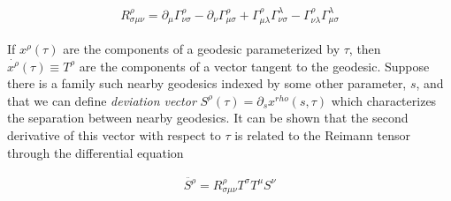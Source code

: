 \documentclass[paper=a4, fontsize=11pt]{scrartcl} %
\numberwithin{equation}{section} %
\numberwithin{figure}{section} %
\numberwithin{table}{section} %
\begin{document}
\begin{align}
R^{\rho}_{\sigma \mu \nu} = \partial_{\mu}\Gamma^{\rho}_{\nu \sigma} - \partial_{\nu}\Gamma^{\rho}_{\mu \sigma} + \Gamma^{\rho}_{\mu \lambda}\Gamma^{\lambda}_{\nu \sigma} - \Gamma^{\rho}_{\nu \lambda}\Gamma^{\lambda}_{\mu \sigma}
\end{align}



If $x^{\rho}(\tau)$ are the components of a geodesic parameterized by $\tau$, then $\dot{x^{\rho}}(\tau) \equiv T^{\rho}$ are the components of a vector tangent to the geodesic. Suppose there is a family such nearby geodesics indexed by some other parameter, $s$, and that we can define \textit{deviation vector} $S^{\rho}(\tau) = \partial_{s}x^{rho}(s,\tau)$ which characterizes the separation between nearby geodesics. It can be shown that the second derivative of this vector with respect to $\tau$ is related to the Reimann tensor through the differential equation
 

\begin{align}
\ddot{S^{\rho}} = R^{\rho}_{\sigma \mu \nu} T^{\sigma} T^{\mu} S^{\nu}
\end{align} 





\end{document}
